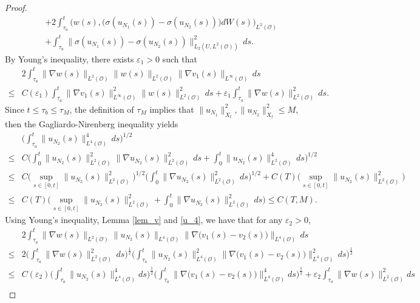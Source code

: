 \documentclass[reqno, 11pt]{amsart}
\theoremstyle{definition}
\numberwithin{equation}{section} \numberwithin{lem}{section}
\numberwithin{thm}{section} \numberwithin{prop}{section}
\numberwithin{cor}{section} \numberwithin{rem}{section}
\numberwithin{defn}{section}
\begin{document}
\begin{proof}
\begin{align}
\nonumber&+2\int_{\tau_a}^t\big(w(s),\big(\sigma({u_{N_1}}(s))-\sigma({u_{N_2}(s)})\big)dW(s)\big)_{L^2(\mathcal {O})}\\&+\int_{\tau_a}^t\|\sigma({u_{N_1}}(s))-\sigma({u_{N_2}(s)})\|_{L_2(U,L^2(\mathcal {O}))}^2\,ds.
\end{align}
 By Young's inequality,  there exists $\varepsilon_1>0$ such that
\begin{align}\label{w_2}
    \nonumber&2 \int_{\tau_a}^t\|\nabla w(s)\|_{L^2(\mathcal {O})}\| w(s)\|_{L^2(\mathcal {O})}\|\nabla v_1(s)\|_{L^\infty(\mathcal {O})}\,ds\\
    \le&C(\varepsilon_1)\int_{\tau_a}^t\|\nabla v_1(s)\|_{L^\infty(\mathcal {O})}^2\| w(s)\|_{L^2(\mathcal {O})}^2\,ds+\varepsilon_1\int_{\tau_a}^t\|\nabla w(s)\|_{L^2(\mathcal {O})}^2\,ds.
\end{align}
Since $t\leq\tau_b\leq\tau_M$, the definition of $\tau_M$
implies that  $\|{u_{N_1}}\|_{X_t}^2,\|{u_{N_2}}\|_{X_t}^2\le M$, then the Gagliardo-Nirenberg inequality yields \begin{align}\label{u_4}
&\nonumber\Big(\int_{\tau_a}^t \|u_{N_2}(s)\|_{L^4(\mathcal {O})}^4\,ds\Big)^{1/2}\\
\nonumber\le&
C\Big(\int_{0}^t \|u_{N_2}(s)\|_{L^2(\mathcal {O})}^2
\|\nabla u_{N_2}(s)\|_{L^2(\mathcal {O})}^2\,ds+\int_{0}^t \|u_{N_2}(s)\|_{L^2(\mathcal {O})}^4
\,ds\Big)^{1/2}\\\nonumber
\le&
C\Big(\sup_{s\in[{0},t]}\|u_{N_2}(s)\|_{L^2(\mathcal {O})}^2\Big)^{1/2}
\Big(\int_{0}^t \|\nabla u_{N_2}(s)\|_{L^2(\mathcal {O})}^2\,ds\Big)^{1/2}+C(T)\Big(\sup_{s\in[{0},t]}\|u_{N_2}(s)\|_{L^2(\mathcal {O})}^2\Big)\\
\le&
C(T)\Big(
\sup_{s\in[{0},t]}\|u_{N_2}(s)\|_{L^2(\mathcal {O})}^2
+
\int_{0}^t \|\nabla u_{N_2}(s)\|_{L^2(\mathcal {O})}^2\,ds
\Big)\le C(T,M).
\end{align}
Using Young's inequality, Lemma \ref{lem_v} and   \eqref{u_4}, we have that for any $\varepsilon_2>0$, 
\begin{align}\label{w_3}
  \nonumber& 2 \int_{\tau_a}^t\|\nabla w(s)\|_{L^2(\mathcal {O})}\|{u_{N_2}}(s)\|_{L^4(\mathcal {O})}\|\nabla\big(v_1(s)-v_2(s)\big)\|_{L^{4}(\mathcal {O})}\,ds\\
  \nonumber\le & 2\Big(\int_{\tau_a}^t\|\nabla w(s)\|_{L^2(\mathcal {O})}^2\,ds\Big)^\frac{1}{2}\Big(\int_{\tau_a}^t\| u_{N_2}(s)\|_{L^4(\mathcal {O})}^2\|\nabla \big(v_1(s)-v_2(s)\big)\|_{L^4(\mathcal {O})}^2\,ds\Big)^\frac{1}{2}\\\nonumber\le &C(\varepsilon_2)\Big(\int_{\tau_a}^t\| u_{N_2}(s)\|_{L^4(\mathcal {O})}^4ds\Big)^{\frac{1}{2}}\Big(\int_{\tau_a}^t\|\nabla\big(v_1(s)-v_2(s)\big)\|_{L^{4}(\mathcal {O})}^4ds\Big)^{\frac{1}{2}}+\varepsilon_2 \int_{\tau_a}^t\|\nabla w(s)\|_{L^2(\mathcal {O})}^2ds\\

\end{align}
\end{proof}
\end{document}
